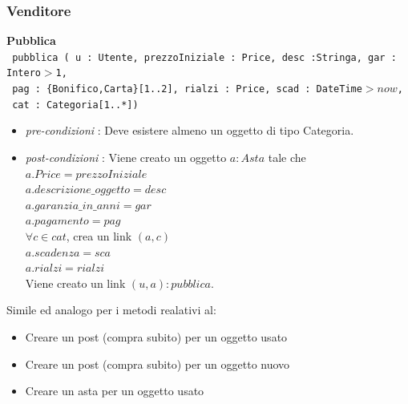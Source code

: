 \documentclass[12pt, letterpaper]{article}
\newcommand{\code}[1]{\colorbox{light-gray}{\texttt{#1}}}
\begin{document}
\subsubsection{Venditore}
\textbf{Pubblica}\\
\code{ pubblica ( u : Utente, prezzoIniziale : Price, desc :Stringa, gar : Intero$>$1,
}\\\code{ pag : \{Bonifico,Carta\}[1..2],
rialzi : Price, scad : DateTime$> now$,}\\\code{ cat : Categoria[1..*])}\begin{itemize}
    \item \textit{pre-condizioni} : Deve esistere almeno un oggetto di tipo Categoria.
    \item \textit{post-condizioni} : Viene creato un oggetto $a:Asta$ tale che\\ 
    $a.Price = prezzoIniziale$\\ 
    $a.descrizione\_oggetto = desc$\\ 
    $a.garanzia\_in\_anni = gar$\\ 
    $a.pagamento = pag$\\
    $\forall c \in cat$, crea un link $(a,c)$\\
    $a.scadenza=sca$ \\
    $a.rialzi=rialzi$\\
    Viene creato un link $(u,a):pubblica$.
\end{itemize}
Simile ed analogo per i metodi realativi al:\begin{itemize}
    \item Creare un post (compra subito) per un oggetto usato 
    \item Creare un post (compra subito) per un oggetto nuovo 
    \item Creare un asta per un oggetto usato
\end{itemize}
\end{document}
